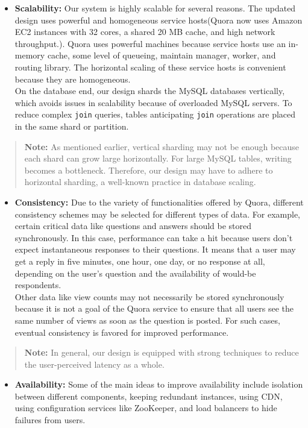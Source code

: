 \begin{itemize}
\item
\protect{}\label{I_N0H_7MNOCGBYDWsONVZ}
\textbf{Scalability:} Our system is highly scalable for several reasons. The updated design uses powerful and homogeneous service hosts(Quora now uses Amazon EC2 instances with 32 cores, a shared 20 MB cache, and high network throughput.). Quora uses powerful machines because service hosts use an in-memory cache, some level of queueing, maintain manager, worker, and routing library. The horizontal scaling of these service hosts is convenient because they are homogeneous.\\
On the database end, our design shards the MySQL databases vertically, which avoids issues in scalability because of overloaded MySQL servers. To reduce complex \texttt{join} queries, tables anticipating \texttt{join} operations are placed in the same shard or partition.
\end{itemize}
\begin{quote}
\textbf{Note:} As mentioned earlier, vertical sharding may not be enough because each shard can grow large horizontally. For large MySQL tables, writing becomes a bottleneck. Therefore, our design may have to adhere to horizontal sharding, a well-known practice in database scaling.
\end{quote}
\begin{itemize}
\item
\protect{}\label{hqkAXUZkWQVCFVrYp4M7p}
\textbf{Consistency:} Due to the variety of functionalities offered by Quora, different consistency schemes may be selected for different types of data. For example, certain critical data like questions and answers should be stored synchronously. In this case, performance can take a hit because users don't expect instantaneous responses to their questions. It means that a user may get a reply in five minutes, one hour, one day, or no response at all, depending on the user's question and the availability of would-be respondents.\\
Other data like view counts may not necessarily be stored synchronously because it is not a goal of the Quora service to ensure that all users see the same number of views as soon as the question is posted. For such cases, eventual consistency is favored for improved performance.
\end{itemize}
\begin{quote}
\textbf{Note:} In general, our design is equipped with strong techniques to reduce the user-perceived latency as a whole.
\end{quote}
\begin{itemize}
\item
\protect{}\label{m8f53CNddBrjeQeoj-NIR}
\textbf{Availability:} Some of the main ideas to improve availability include isolation between different components, keeping redundant instances, using CDN, using configuration services like ZooKeeper, and load balancers to hide failures from users.
\end{itemize}

